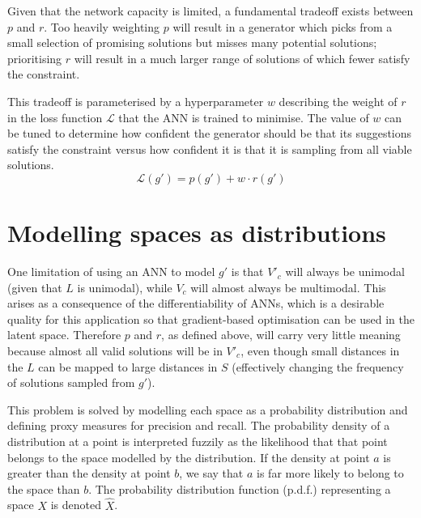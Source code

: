\documentclass[../../main.tex]{subfiles}
\begin{document}
Given that the network capacity is limited, a fundamental tradeoff exists between $p$ and $r$.
Too heavily weighting $p$ will result in a generator which picks from a small selection of promising solutions but misses many potential solutions; prioritising $r$ will result in a much larger range of solutions of which fewer satisfy the constraint.

This tradeoff is parameterised by a hyperparameter $w$ describing the weight of $r$ in the loss function $\mathcal{L}$ that the ANN is trained to minimise.
The value of $w$ can be tuned to determine how confident the generator should be that its suggestions satisfy the constraint versus how confident it is that it is sampling from all viable solutions.
\begin{equation}
	\mathcal{L}(g')=p(g')+w\cdot r(g')
\end{equation}

\section{Modelling spaces as distributions} \label{section:modellingSpacesAsDistributions}

One limitation of using an ANN to model $g'$ is that $V'_c$ will always be unimodal (given that $L$ is unimodal), while $V_c$ will almost always be multimodal.
This arises as a consequence of the differentiability of ANNs, which is a desirable quality for this application so that gradient-based optimisation can be used in the latent space.
Therefore $p$ and $r$, as defined above, will carry very little meaning because almost all valid solutions will be in $V'_c$, even though small distances in the $L$ can be mapped to large distances in $S$ (effectively changing the frequency of solutions sampled from $g'$).

This problem is solved by modelling each space as a probability distribution and defining proxy measures for precision and recall.
The probability density of a distribution at a point is interpreted fuzzily as the likelihood that that point belongs to the space modelled by the distribution.
If the density at point $a$ is greater than the density at point $b$, we say that $a$ is far more likely to belong to the space than $b$.
The probability distribution function (p.d.f.) representing a space $X$ is denoted $\hat{X}$.
\end{document}

